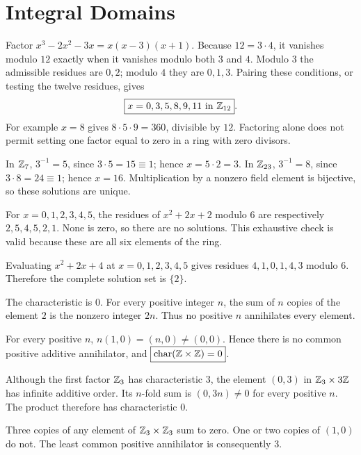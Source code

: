 \section{Integral Domains}

Factor $x^3-2x^2-3x=x(x-3)(x+1)$. Because $12=3\cdot4$, it vanishes modulo $12$ exactly when it vanishes modulo both $3$ and $4$. Modulo $3$ the admissible residues are $0,2$; modulo $4$ they are $0,1,3$. Pairing these conditions, or testing the twelve residues, gives
\[\boxed{x=0,3,5,8,9,11\text{ in }\mathbb{Z}_{12}}.
\]
For example $x=8$ gives $8\cdot5\cdot9=360$, divisible by $12$. Factoring alone does not permit setting one factor equal to zero in a ring with zero divisors.

In $\mathbb{Z}_7$, $3^{-1}=5$, since $3\cdot5=15\equiv1$; hence $x=5\cdot2=\boxed3$. In $\mathbb{Z}_{23}$, $3^{-1}=8$, since $3\cdot8=24\equiv1$; hence $x=\boxed {16}$. Multiplication by a nonzero field element is bijective, so these solutions are unique.

For $x=0,1,2,3,4,5$, the residues of $x^2+2x+2$ modulo $6$ are respectively $2,5,4,5,2,1$. None is zero, so there are $\boxed{\text{no solutions}}$. This exhaustive check is valid because these are all six elements of the ring.

Evaluating $x^2+2x+4$ at $x=0,1,2,3,4,5$ gives residues $4,1,0,1,4,3$ modulo $6$. Therefore the complete solution set is $\boxed{\{2\}}$.

The characteristic is $0$. For every positive integer $n$, the sum of $n$ copies of the element $2$ is the nonzero integer $2n$. Thus no positive $n$ annihilates every element.

For every positive $n$, $n(1,0)=(n,0)\ne(0,0)$. Hence there is no common positive additive annihilator, and $\boxed{\operatorname{char}(\mathbb{Z}\times\mathbb{Z})=0}$.

Although the first factor $\mathbb{Z}_3$ has characteristic $3$, the element $(0,3)$ in $\mathbb{Z}_3\times3\mathbb{Z}$ has infinite additive order. Its $n$-fold sum is $(0,3n)\ne0$ for every positive $n$. The product therefore has characteristic $\boxed0$.

Three copies of any element of $\mathbb{Z}_3\times\mathbb{Z}_3$ sum to zero. One or two copies of $(1,0)$ do not. The least common positive annihilator is consequently $\boxed3$.

